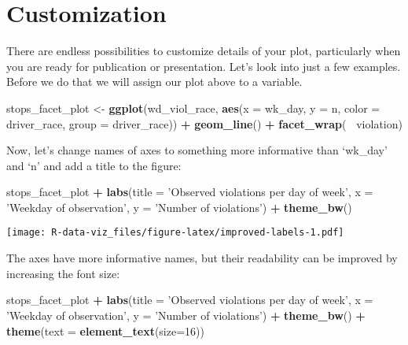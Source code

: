 \documentclass[]{book}
\newenvironment{Shaded}{\begin{snugshade}}{\end{snugshade}}
\newcommand{\KeywordTok}[1]{\textcolor[rgb]{0.13,0.29,0.53}{\textbf{#1}}}
\newcommand{\DataTypeTok}[1]{\textcolor[rgb]{0.13,0.29,0.53}{#1}}
\newcommand{\DecValTok}[1]{\textcolor[rgb]{0.00,0.00,0.81}{#1}}
\newcommand{\StringTok}[1]{\textcolor[rgb]{0.31,0.60,0.02}{#1}}
\newcommand{\OperatorTok}[1]{\textcolor[rgb]{0.81,0.36,0.00}{\textbf{#1}}}
\newcommand{\NormalTok}[1]{#1}
\theoremstyle{definition}
\theoremstyle{definition}
\theoremstyle{definition}
\theoremstyle{remark}
\begin{document}
\section{Customization}\label{customization}

There are endless possibilities to customize details of your plot,
particularly when you are ready for publication or presentation. Let's
look into just a few examples. Before we do that we will assign our plot
above to a variable.

\begin{Shaded}
\begin{Highlighting}[]
\NormalTok{stops_facet_plot <-}\StringTok{ }\KeywordTok{ggplot}\NormalTok{(wd_viol_race, }\KeywordTok{aes}\NormalTok{(}\DataTypeTok{x =}\NormalTok{ wk_day, }\DataTypeTok{y =}\NormalTok{ n, }\DataTypeTok{color =}\NormalTok{ driver_race, }\DataTypeTok{group =}\NormalTok{ driver_race)) }\OperatorTok{+}
\StringTok{  }\KeywordTok{geom_line}\NormalTok{() }\OperatorTok{+}\StringTok{ }
\StringTok{  }\KeywordTok{facet_wrap}\NormalTok{(}\OperatorTok{~}\StringTok{ }\NormalTok{violation)}
\end{Highlighting}
\end{Shaded}

Now, let's change names of axes to something more informative than
`wk\_day' and `n' and add a title to the figure:

\begin{Shaded}
\begin{Highlighting}[]
\NormalTok{stops_facet_plot }\OperatorTok{+}
\StringTok{  }\KeywordTok{labs}\NormalTok{(}\DataTypeTok{title =} \StringTok{'Observed violations per day of week'}\NormalTok{,}
         \DataTypeTok{x =} \StringTok{'Weekday of observation'}\NormalTok{,}
         \DataTypeTok{y =} \StringTok{'Number of violations'}\NormalTok{) }\OperatorTok{+}
\StringTok{  }\KeywordTok{theme_bw}\NormalTok{()}
\end{Highlighting}
\end{Shaded}

\texttt{[image: R-data-viz\_files/figure-latex/improved-labels-1.pdf]}

The axes have more informative names, but their readability can be
improved by increasing the font size:

\begin{Shaded}
\begin{Highlighting}[]
\NormalTok{stops_facet_plot }\OperatorTok{+}
\StringTok{  }\KeywordTok{labs}\NormalTok{(}\DataTypeTok{title =} \StringTok{'Observed violations per day of week'}\NormalTok{,}
         \DataTypeTok{x =} \StringTok{'Weekday of observation'}\NormalTok{,}
         \DataTypeTok{y =} \StringTok{'Number of violations'}\NormalTok{) }\OperatorTok{+}
\StringTok{  }\KeywordTok{theme_bw}\NormalTok{() }\OperatorTok{+}\StringTok{ }
\StringTok{  }\KeywordTok{theme}\NormalTok{(}\DataTypeTok{text =} \KeywordTok{element_text}\NormalTok{(}\DataTypeTok{size=}\DecValTok{16}\NormalTok{))}
\end{Highlighting}
\end{Shaded}
\end{document}
